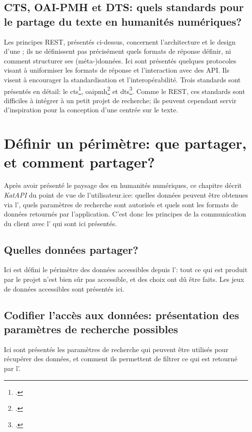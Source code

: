 \section{CTS, OAI-PMH et DTS: quels standards pour le partage du texte en humanités numériques?}
Les principes REST, présentés ci-dessus, concernent l'architecture et le design d'une \api{}; ils ne définissent pas précisément quels formats de réponse définir, ni comment structurer ses (méta-)données. Ici sont présentés quelques protocoles visant à uniformiser les formats de réponse et l'interaction avec des API. Ils visent à encourager la standardisation et l'interopérabilité. Trois standards sont présentés en détail: le \gls{cts}\footcite{almas_continuous_2018}, \gls{oaipmh}\footcite{prime-claverie_defi_2017} et \gls{dts}\footcite{almas_distributed_2021}. Comme le REST, ces standards sont difficiles à intégrer à un petit projet de recherche; ils peuvent cependant servir d'inspiration pour la conception  d'une \api{} centrée sur le texte.

\chapter{Définir un périmètre: que partager, et comment partager?}
Après avoir présenté le paysage des \api{} en humanités numériques, ce chapitre décrit \textit{KatAPI} du point de vue de l'utilisateur.ice: quelles données peuvent être obtenues via l'\api{}, quels paramètres de recherche sont autorisés et quels sont les formats de données retournés par l'application. C'est donc les principes de la communication du client avec l'\api{} qui sont ici présentés.

\section{Quelles données partager?}
Ici est défini le périmètre des données accessibles depuis l'\api{}: tout ce qui est produit par le projet n'est bien sûr pas accessible, et des choix ont dû être faits. Les jeux de données accessibles sont présentés ici.

\section{Codifier l'accès aux données: présentation des paramètres de recherche possibles}
Ici sont présentés les paramètres de recherche qui peuvent être utilisés pour récupérer des données, et comment ils permettent de filtrer ce qui est retourné par l'\api{}.

